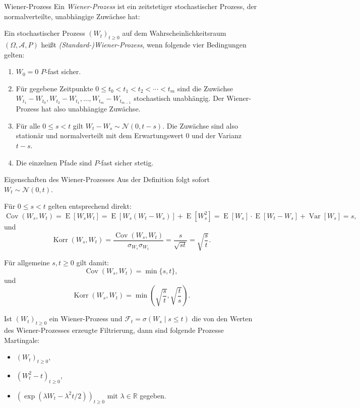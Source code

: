 \begin{defi}{Wiener-Prozess}
    Ein \emph{Wiener-Prozess} ist ein zeitstetiger stochastischer Prozess, der normalverteilte, unabhängige Zuwächse hat:

    Ein stochastischer Prozess $(W_{t})_{t \geq 0}$ auf dem Wahrscheinlichkeitsraum $(\Omega ,{\mathcal{A}},P)$ heißt \emph{(Standard-)Wiener-Prozess}, wenn folgende vier Bedingungen gelten:
    \begin{enumerate}
        \item $W_{0}=0$ $P$-fast sicher.
        \item Für gegebene Zeitpunkte $0\leq t_{0}<t_{1}<t_{2}<\dotsb <t_{m}$ sind die Zuwächse $W_{t_{1}}-W_{t_{0}},W_{t_{2}}-W_{t_{1}},\dotsc ,W_{t_{m}}-W_{t_{m-1}}$ stochastisch unabhängig.
              Der Wiener-Prozess hat also unabhängige Zuwächse.
        \item Für alle $0\leq s<t$ gilt $W_{t}-W_{s} \sim{\mathcal{N}}\left(0,t-s\right)$.
              Die Zuwächse sind also stationär und normalverteilt mit dem Erwartungswert $0$ und der Varianz $t-s$.
        \item Die einzelnen Pfade sind $P$-fast sicher stetig.
    \end{enumerate}
\end{defi}

\begin{defi}{Eigenschaften des Wiener-Prozesses}
    Aus der Definition folgt sofort $W_{t}\sim{\mathcal{N}}(0,t)$.

    Für $0 \leq s < t$ gelten entsprechend direkt:
    \[
        \operatorname{Cov} (W_{s},W_{t}) = \operatorname{E} [W_{s}W_{t}] = \operatorname{E} [W_{s}(W_{t}-W_{s})] + \operatorname{E}[W_{s}^{2}] = \operatorname{E} [W_{s}] \cdot \operatorname{E}[W_{t}-W_{s}] + \operatorname{Var}[W_{s}] = s,
    \]
    und
    \[
        \operatorname{Korr} (W_{s},W_{t}) = \frac{\operatorname{Cov} (W_{s},W_{t})}{\sigma_{W_{s}}\sigma_{W_{t}}} = \frac{s}{\sqrt{st}} = \sqrt{\frac{s}{t}}.
    \]

    Für allgemeine $s,t\geq 0$ gilt damit:
    \[
        \operatorname{Cov} (W_{s},W_{t}) = \min \{s,t\},
    \]
    und
    \[
        \operatorname{Korr} (W_{s},W_{t}) = \min \left(\sqrt{\frac{s}{t}}, \sqrt{\frac{t}{s}}\right).
    \]

    Ist $(W_{t})_{t \geq 0}$ ein Wiener-Prozess und $\mathcal{F}_{t} = \sigma (W_{s} \mid s\leq t)$ die von den Werten des Wiener-Prozesses erzeugte Filtrierung, dann sind folgende Prozesse Martingale:
    \begin{itemize}
        \item $(W_{t})_{t \geq 0}$,
        \item $(W_{t}^{2}-t)_{t \geq 0}$,
        \item $(\exp(\lambda W_{t}-\lambda ^{2}t/2))_{t \geq 0}$ mit $\lambda \in \mathbb{R}$ gegeben.
    \end{itemize}
\end{defi}

